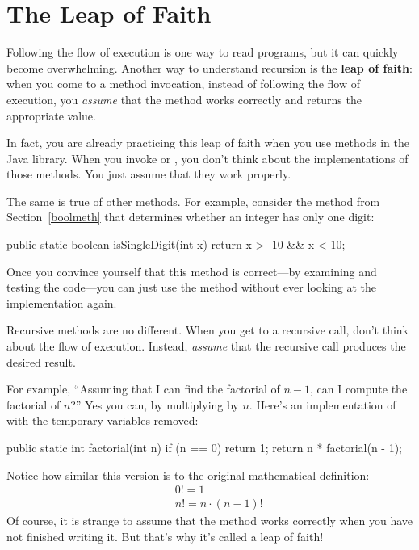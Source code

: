 \section{The Leap of Faith}
\label{leap_of_faith}


Following the flow of execution is one way to read programs, but it can quickly become overwhelming.
Another way to understand recursion is the {\bf leap of faith}:
when you come to a method invocation, instead of following the flow of execution, you {\em assume} that the method works correctly and returns the appropriate value.

In fact, you are already practicing this leap of faith when you use methods in the Java library.
When you invoke  or , you don't think about the implementations of those methods.
You just assume that they work properly.

The same is true of other methods.
For example, consider the method from Section~\ref{boolmeth} that determines whether an integer has only one digit:

\begin{code}
public static boolean isSingleDigit(int x) {
    return x > -10 && x < 10;
}
\end{code}

Once you convince yourself that this method is correct---by examining and testing the code---you can just use the method without ever looking at the implementation again.

Recursive methods are no different.
When you get to a recursive call, don't think about the flow of execution.
Instead, {\em assume} that the recursive call produces the desired result.

For example, ``Assuming that I can find the factorial of $n-1$, can I compute the factorial of $n$?''
Yes you can, by multiplying by $n$.
Here's an implementation of  with the temporary variables removed:

\begin{code}
public static int factorial(int n) {
    if (n == 0) {
        return 1;
    }
    return n * factorial(n - 1);
}
\end{code}

Notice how similar this version is to the original mathematical definition:
%
\begin{eqnarray*}
&&  0! = 1 \\
&&  n! = n \cdot(n-1)!
\end{eqnarray*}
%
Of course, it is strange to assume that the method works correctly when you have not finished writing it.
But that's why it's called a leap of faith!


